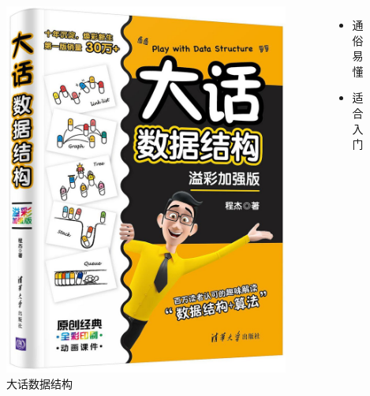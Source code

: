 \begin{frame}{\insertsubsectionhead}
    \begin{columns}
        \vspace{4ex}
        \begin{figure}
            \centering
            \includegraphics[height=0.6\textheight]{images/cheng2020dahua.jpg}
            \caption{大话数据结构\cite{cheng2020dahua}}
            \label{fig:cheng20200dahua}
        \end{figure}
        \begin{itemize}
            \item 通俗易懂
            \item 适合入门
        \end{itemize}
    \end{columns}
\end{frame}

